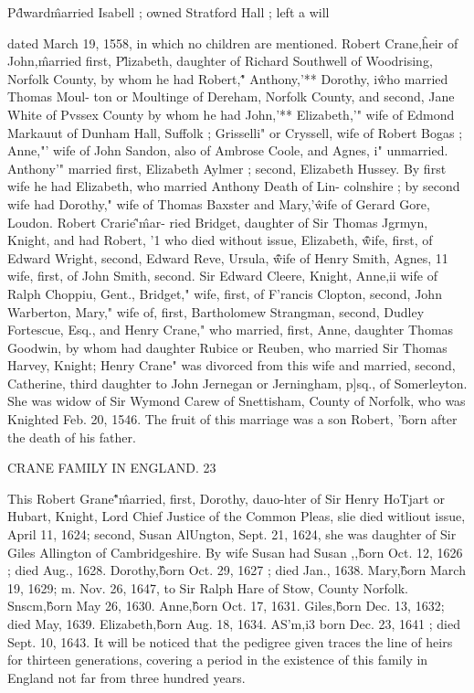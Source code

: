P\^dward\^ married Isabell ; owned Stratford Hall ; left a will 

dated March 19, 1558, in which no children are mentioned. 
Robert Crane,\^ heir of John,\^ married first, P\^lizabeth, daughter 
of Richard Southwell of Woodrising, Norfolk County, by whom he 
had Robert,\^" Anthony,'** Dorothy, i\^ who married Thomas Moul- 
ton or Moultinge of Dereham, Norfolk County, and second, Jane 
White of Pvssex County by whom he had John,'** Elizabeth,'" 
wife of Edmond Markauut of Dunham Hall, Suffolk ; Grisselli" 
or Cryssell, wife of Robert Bogas ; Anne,"' wife of John Sandon, 
also of Ambrose Coole, and Agnes, i" unmarried. Anthony'" 
married first, Elizabeth Aylmer ; second, Elizabeth Hussey. By 
first wife he had Elizabeth, who married Anthony Death of Lin- 
colnshire ; by second wife had Dorothy," wife of Thomas Baxster 
and Mary,'\^ wife of Gerard Gore, Loudon. Robert Crarie\^'\^ mar- 
ried Bridget, daughter of Sir Thomas Jgrmyn, Knight, and had 
Robert, '1 who died without issue, Elizabeth, \^\^ wife, first, of 
Edward Wright, second, Edward Reve, Ursula, \^\^ wife of Henry 
Smith, Agnes, 11 wife, first, of John Smith, second. Sir Edward 
Cleere, Knight, Anne,ii wife of Ralph Choppiu, Gent., Bridget," 
wife, first, of F'rancis Clopton, second, John Warberton, Mary," 
wife of, first, Bartholomew Strangman, second, Dudley Fortescue, 
Esq., and Henry Crane," who married, first, Anne, daughter 
Thomas Goodwin, by whom had daughter Rubice or Reuben, 
who married Sir Thomas Harvey, Knight; Henry Crane" was 
divorced from this wife and married, second, Catherine, third 
daughter to John Jernegan or Jerningham, p]sq., of Somerleyton. 
She was widow of Sir Wymond Carew of Snettisham, County of 
Norfolk, who was Knighted Feb. 20, 1546. The fruit of this 
marriage was a son Robert, '\^ born after the death of his father. 



CRANE FAMILY IN ENGLAND. 23 

This Robert Grane\^"\^ married, first, Dorothy, dauo-hter of Sir 
Henry HoTjart or Hubart, Knight, Lord Chief Justice of the 
Common Pleas, slie died witliout issue, April 11, 1624; second, 
Susan AlUngton, Sept. 21, 1624, she was daughter of Sir Giles 
Allington of Cambridgeshire. By wife Susan had Susan ,,\^\^ born 
Oct. 12, 1626 ; died Aug., 1628. Dorothy,\^\^ born Oct. 29, 1627 ; 
died Jan., 1638. Mary,\^\^ born March 19, 1629; m. Nov. 26, 
1647, to Sir Ralph Hare of Stow, County Norfolk. Snscm,\^\^ 
born May 26, 1630. Anne,\^\^ born Oct. 17, 1631. Giles,\^\^ born 
Dec. 13, 1632; died May, 1639. Elizabeth,\^\^ born Aug. 18, 
1634. AS'm,i3 born Dec. 23, 1641 ; died Sept. 10, 1643. It will 
be noticed that the pedigree given traces the line of heirs for 
thirteen generations, covering a period in the existence of this 
family in England not far from three hundred years. 

